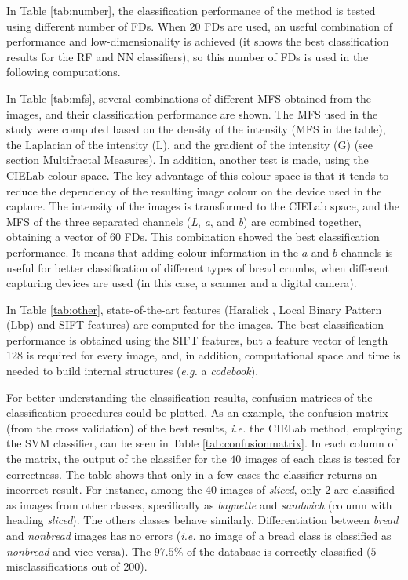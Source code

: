In Table \ref{tab:number}, the classification performance of the method is tested using different number of FDs. When $20$ FDs are used, an useful combination of performance and low-di\-men\-sio\-na\-li\-ty is achieved (it shows the best classification results for the RF and NN classifiers), so this number of FDs is used in the following computations. 

In Table \ref{tab:mfs}, several combinations of different MFS obtained from the images, and their classification performance are shown. The MFS used in the study were computed based on the density of the intensity (MFS in the table), the Laplacian of the intensity (L), and the gradient of the intensity (G) (see section Multifractal Measures). In addition, another test is made, using the CIELab \cite{Hunter58} colour space. The key advantage of this colour space is that it tends to reduce the dependency of the resulting image colour on the device used in the capture. The intensity of the images is transformed to the CIELab space, and the MFS of the three separated channels ({\em L}, {\em a}, and {\em b}) are combined together, obtaining a vector of $60$ FDs. This combination showed the best classification performance. It means that adding colour information in the $a$ and $b$ channels is useful for better classification of different types of bread crumbs, when different capturing devices are used (in this case, a scanner and a digital camera).

In Table \ref{tab:other}, state-of-the-art features (Haralick \cite{Haralick73}, Local Binary Pattern (Lbp) \cite{Ojala96} and SIFT \cite{Lowe2004} features) are computed for the images. The best classification performance is obtained using the SIFT features, but a feature vector of length 128 is required for every image, and, in addition, computational space and time is needed to build internal structures ({\em e.g.} a {\em codebook}). 

For better understanding the classification results, confusion matrices of the classification procedures could be plotted. As an example, the confusion matrix (from the cross validation) of the best results, {\em i.e.} the CIELab method, employing the SVM classifier, can be seen in Table \ref{tab:confusionmatrix}. In each column of the matrix, the output of the classifier for the $40$ images of each class is tested for correctness. The table shows that only in a few cases the classifier returns an incorrect result. For instance, among the $40$ images of {\em sliced}, only $2$ are  classified as images from other classes, specifically as {\em baguette} and {\em sandwich} (column with heading {\em sliced}). The others classes behave similarly. Differentiation between {\em bread} and {\em nonbread} images has no errors ({\em i.e.} no image of a bread class is classified as {\em nonbread} and vice versa). The $97.5\%$ of the database is correctly classified ($5$ misclassifications out of $200$).

